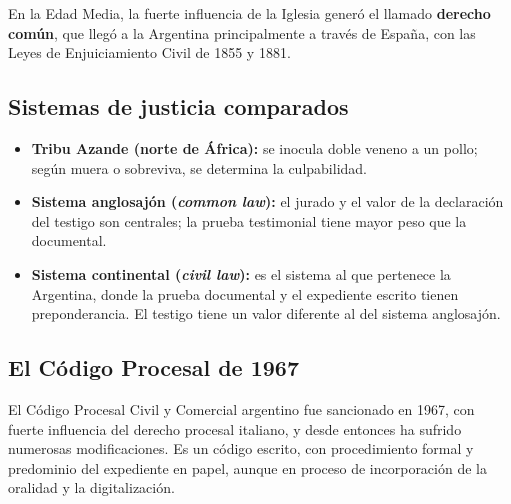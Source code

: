 \documentclass[12pt,oneside]{book}
\begin{document}
En la Edad Media, la fuerte influencia de la Iglesia generó el llamado \textbf{derecho común}, que llegó a la Argentina principalmente a través de España, con las Leyes de Enjuiciamiento Civil de 1855 y 1881.

\subsection{Sistemas de justicia comparados}

\begin{itemize}
\item \textbf{Tribu Azande (norte de África):} se inocula doble veneno a un pollo; según muera o sobreviva, se determina la culpabilidad.
\item \textbf{Sistema anglosajón (\textit{common law}):} el jurado y el valor de la declaración del testigo son centrales; la prueba testimonial tiene mayor peso que la documental.
\item \textbf{Sistema continental (\textit{civil law}):} es el sistema al que pertenece la Argentina, donde la prueba documental y el expediente escrito tienen preponderancia. El testigo tiene un valor diferente al del sistema anglosajón.
\end{itemize}

\subsection{El Código Procesal de 1967}

El Código Procesal Civil y Comercial argentino fue sancionado en 1967, con fuerte influencia del derecho procesal italiano, y desde entonces ha sufrido numerosas modificaciones. Es un código escrito, con procedimiento formal y predominio del expediente en papel, aunque en proceso de incorporación de la oralidad y la digitalización.
\end{document}
